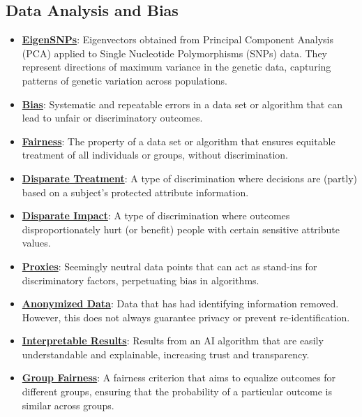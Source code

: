 \documentclass{article}%
\begin{document}
%
\subsection{Data Analysis and Bias}%
\label{subsec:DataAnalysisandBias}%
\begin{itemize}[leftmargin=*]%
\item \href{https://www.math.purdue.edu/~yipn/351/11L2-svd-pca-recommender.pdf#page=28}{\textbf{EigenSNPs}}: Eigenvectors obtained from Principal Component Analysis (PCA) applied to Single Nucleotide Polymorphisms (SNPs) data. They represent directions of maximum variance in the genetic data, capturing patterns of genetic variation across populations.%
\item \href{https://www.math.purdue.edu/~yipn/351/16L2-ethics.pdf#page=2}{\textbf{Bias}}: Systematic and repeatable errors in a data set or algorithm that can lead to unfair or discriminatory outcomes.%
\item \href{https://www.math.purdue.edu/~yipn/351/16L2-ethics.pdf#page=2}{\textbf{Fairness}}: The property of a data set or algorithm that ensures equitable treatment of all individuals or groups, without discrimination.%
\item \href{https://www.math.purdue.edu/~yipn/351/16L2-ethics.pdf#page=19}{\textbf{Disparate Treatment}}: A type of discrimination where decisions are (partly) based on a subject's protected attribute information.%
\item \href{https://www.math.purdue.edu/~yipn/351/16L2-ethics.pdf#page=19}{\textbf{Disparate Impact}}: A type of discrimination where outcomes disproportionately hurt (or benefit) people with certain sensitive attribute values.%
\item \href{https://www.math.purdue.edu/~yipn/351/16L2-ethics.pdf#page=13}{\textbf{Proxies}}: Seemingly neutral data points that can act as stand-ins for discriminatory factors, perpetuating bias in algorithms.%
\item \href{https://www.math.purdue.edu/~yipn/351/16L2-ethics.pdf#page=10}{\textbf{Anonymized Data}}: Data that has had identifying information removed. However, this does not always guarantee privacy or prevent re-identification.%
\item \href{https://www.math.purdue.edu/~yipn/351/16L2-ethics.pdf#page=28}{\textbf{Interpretable Results}}: Results from an AI algorithm that are easily understandable and explainable, increasing trust and transparency.%
\item \href{https://www.math.purdue.edu/~yipn/351/16L2-ethics.pdf#page=26}{\textbf{Group Fairness}}: A fairness criterion that aims to equalize outcomes for different groups, ensuring that the probability of a particular outcome is similar across groups.%

\end{itemize}
\end{document}
